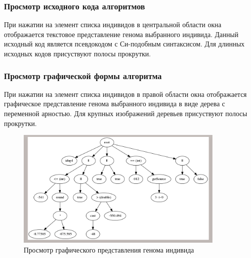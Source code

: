 \documentclass[russian,utf8,emptystyle]{eskdtext}
\begin{document}
\subsubsection{Просмотр исходного кода алгоритмов}
При нажатии на элемент списка индивидов в центральной области окна отображается текстовое представление генома выбранного индивида. Данный исходный код является псевдокодом с Си-подобным синтаксисом. Для длинных исходных кодов присуствуют полосы прокрутки.

\subsubsection{Просмотр графической формы алгоритма}
При нажатии на элемент списка индивидов в правой области окна отображается графическое представление генома выбранного индивида в виде дерева с переменной арностью. Для крупных изображений деревьев присуствуют полосы прокрутки.

\begin{figure}[h!]
\centering
\includegraphics[width=0.9\textwidth]{screen11}
\caption{Просмотр графического представления генома индивида}
\end{figure}
\end{document}
